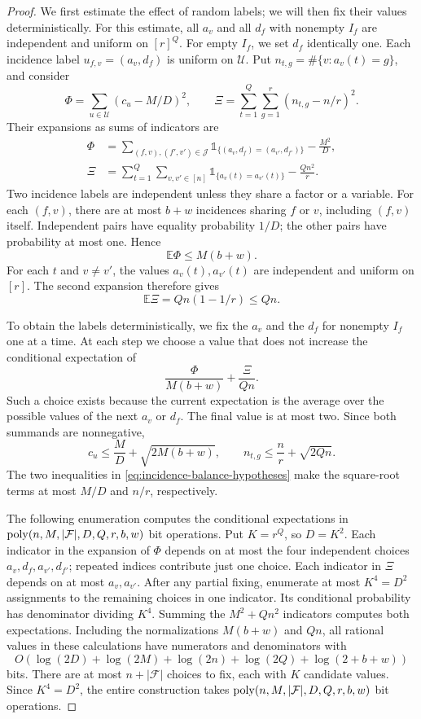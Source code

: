 \begin{proof}
We first estimate the effect of random labels; we will then fix
their values deterministically. For this estimate, all $a_v$ and
all $d_f$ with nonempty $I_f$ are independent and uniform on $[r]^Q$.
For empty $I_f$, we set $d_f$ identically one.
Each incidence label $u_{f,v}=(a_v,d_f)$ is uniform on $\mathcal U$.
Put $n_{t,g}=\#\{v:a_v(t)=g\}$, and consider
\[
 \Phi=\sum_{u\in\mathcal U}(c_u-M/D)^2,
 \qquad
 \Xi=\sum_{t=1}^Q\sum_{g=1}^r(n_{t,g}-n/r)^2.
\]
Their expansions as sums of indicators are
\[
 \begin{aligned}
 \Phi&=\sum_{(f,v),(f',v')\in\mathcal J}
       \mathds{1}_{\{(a_v,d_f)=(a_{v'},d_{f'})\}}-\frac{M^2}{D},\\
 \Xi&=\sum_{t=1}^Q\sum_{v,v'\in[n]}
       \mathds{1}_{\{a_v(t)=a_{v'}(t)\}}-\frac{Qn^2}{r}.
 \end{aligned}
\]
Two incidence labels are independent unless they share a factor or a
variable. For each $(f,v)$, there are at most $b+w$ incidences sharing
$f$ or $v$, including $(f,v)$ itself. Independent pairs have equality
probability $1/D$; the other pairs have probability at most one. Hence
\[
 \mathbb E\Phi\le M(b+w).
\]
For each $t$ and $v\ne v'$, the values $a_v(t),a_{v'}(t)$ are independent
and uniform on $[r]$. The second expansion therefore gives
\[
 \mathbb E\Xi=Qn(1-1/r)\le Qn.
\]

To obtain the labels deterministically, we fix the $a_v$ and the
$d_f$ for nonempty $I_f$ one at a time. At each step we choose a
value that does not increase the conditional expectation of
\[
 \frac{\Phi}{M(b+w)}+\frac{\Xi}{Qn}.
\]
Such a choice exists because the current expectation is the average
over the possible values of the next $a_v$ or $d_f$. The final value
is at most two. Since both summands are nonnegative,
\[
 c_u\le\frac MD+\sqrt{2M(b+w)},\qquad
 n_{t,g}\le\frac nr+\sqrt{2Qn}.
\]
The two inequalities in \eqref{eq:incidence-balance-hypotheses} make
the square-root terms at most $M/D$ and $n/r$, respectively.

The following enumeration computes the conditional expectations in
$\operatorname{poly}(n,M,|\mathcal F|,D,Q,r,b,w)$ bit operations.
Put $K=r^Q$, so $D=K^2$. Each indicator in the expansion of
$\Phi$ depends on at most the four independent choices
$a_v,d_f,a_{v'},d_{f'}$; repeated indices contribute just one choice.
Each indicator in $\Xi$ depends on at most $a_v,a_{v'}$. After any
partial fixing, enumerate at most $K^4=D^2$ assignments to the
remaining choices in one indicator. Its conditional probability has
denominator dividing $K^4$. Summing the $M^2+Qn^2$ indicators computes
both expectations. Including the normalizations $M(b+w)$ and $Qn$,
all rational values in these calculations have numerators and
denominators with
\[
 O\!\left(\log(2D)+\log(2M)+\log(2n)+\log(2Q)+\log(2+b+w)\right)
\]
bits. There are at most $n+|\mathcal F|$ choices to fix, each with
$K$ candidate values. Since $K^4=D^2$, the entire construction takes
$\operatorname{poly}(n,M,|\mathcal F|,D,Q,r,b,w)$ bit operations.
\end{proof}

